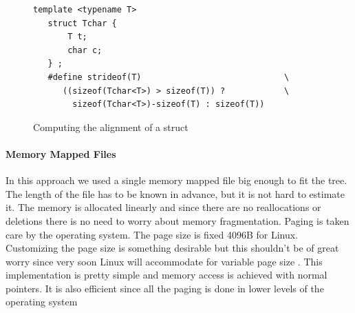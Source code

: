 \documentclass[12pt,letterpaper,doublespaced,ETD,dvips,proposal]{gtthesis}
\begin{document}
\begin{Body}
\begin{figure}[!htb]
\label{Alignment}
\begin{boxedminipage}[c]{\linewidth}
\begin{verbatim}
template <typename T>
   struct Tchar {
       T t;
       char c;
   } ;
   #define strideof(T)                             \
      ((sizeof(Tchar<T>) > sizeof(T)) ?            \
        sizeof(Tchar<T>)-sizeof(T) : sizeof(T))
\end{verbatim}
\end{boxedminipage}
\caption{Computing the alignment of a struct}
\end{figure}

\paragraph{Memory Mapped Files} In this approach we used a single memory
mapped file big enough to fit the tree. The length of the file has
to be known in advance, but it is not hard to estimate it. The memory is
allocated linearly and since there are no reallocations or deletions
there is no need to worry about memory fragmentation. Paging is
taken care by the operating system. The page size is fixed 4096B for
Linux. Customizing the page size is something desirable but this
shouldn't be of great worry since very soon Linux will accommodate
for variable page size \cite{winwood2002mps}. This implementation is pretty simple and
memory access is achieved with normal pointers. It is also efficient
since all the paging is done in lower levels of the operating system


\end{Body}
\end{document}
